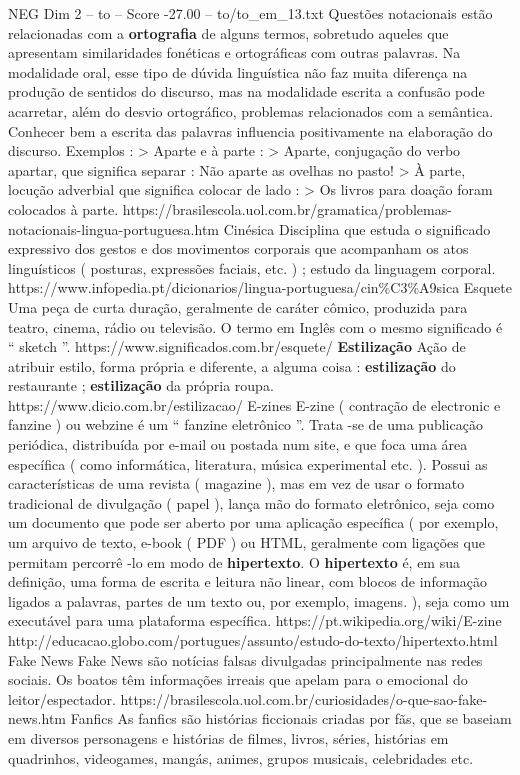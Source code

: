 \begin{textsample}{NEG Dim 2 – to – Score -27.00 – to/to\_em\_13.txt}
Questões notacionais estão relacionadas com a \textbf{ortografia} de alguns termos, sobretudo aqueles que apresentam similaridades fonéticas e ortográficas com outras palavras.
Na modalidade oral, esse tipo de dúvida linguística não faz muita diferença na produção de sentidos do discurso, mas na modalidade escrita a confusão pode acarretar, além do desvio ortográfico, problemas relacionados com a semântica.
Conhecer bem a escrita das palavras influencia positivamente na elaboração do discurso.
Exemplos : > Aparte e à parte : > Aparte, conjugação do verbo apartar, que significa separar : Não aparte as ovelhas no pasto! > À parte, locução adverbial que significa colocar de lado : > Os livros para doação foram colocados à parte. https://brasilescola.uol.com.br/gramatica/problemas-notacionais-lingua-portuguesa.htm Cinésica Disciplina que estuda o significado expressivo dos gestos e dos movimentos corporais que acompanham os atos linguísticos ( posturas, expressões faciais, etc. ) ; estudo da linguagem corporal. https://www.infopedia.pt/dicionarios/lingua-portuguesa/cin\%C3\%A9sica Esquete Uma peça de curta duração, geralmente de caráter cômico, produzida para teatro, cinema, rádio ou televisão.
O termo em Inglês com o mesmo significado é “ sketch ”. https://www.significados.com.br/esquete/ \textbf{Estilização} Ação de atribuir estilo, forma própria e diferente, a alguma coisa : \textbf{estilização} do restaurante ; \textbf{estilização} da própria roupa. https://www.dicio.com.br/estilizacao/ E-zines E-zine ( contração de electronic e fanzine ) ou webzine é um “ fanzine eletrônico ”.
Trata -se de uma publicação periódica, distribuída por e-mail ou postada num site, e que foca uma área específica ( como informática, literatura, música experimental etc. ).
Possui as características de uma revista ( magazine ), mas em vez de usar o formato tradicional de divulgação ( papel ), lança mão do formato eletrônico, seja como um documento que pode ser aberto por uma aplicação específica ( por exemplo, um arquivo de texto, e-book ( PDF ) ou HTML, geralmente com ligações que permitam percorrê -lo em modo de \textbf{hipertexto}.
O \textbf{hipertexto} é, em sua definição, uma forma de escrita e leitura não linear, com blocos de informação ligados a palavras, partes de um texto ou, por exemplo, imagens. ), seja como um executável para uma plataforma específica. https://pt.wikipedia.org/wiki/E-zine http://educacao.globo.com/portugues/assunto/estudo-do-texto/hipertexto.html Fake News Fake News são notícias falsas divulgadas principalmente nas redes sociais.
Os boatos têm informações irreais que apelam para o emocional do leitor/espectador. https://brasilescola.uol.com.br/curiosidades/o-que-sao-fake-news.htm Fanfics As fanfics são histórias ficcionais criadas por fãs, que se baseiam em diversos personagens e histórias de filmes, livros, séries, histórias em quadrinhos, videogames, mangás, animes, grupos musicais, celebridades etc.

\end{textsample}

